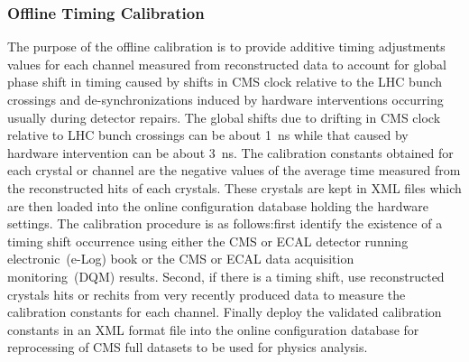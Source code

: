 \subsubsection{Offline Timing Calibration}
The purpose of the offline calibration is to provide additive timing adjustments values for each channel measured from reconstructed data to account for global phase shift in timing caused by shifts in CMS clock relative to the LHC bunch crossings and de-synchronizations induced by hardware interventions occurring usually during detector repairs. The global shifts due to drifting in CMS clock relative to LHC bunch crossings can be about 1~ns while that caused by hardware intervention can be about 3~ns. The calibration constants obtained for each crystal or channel are the negative values of the average time measured from the reconstructed hits of each crystals.
These crystals are  kept in XML files which are then loaded into the online configuration database holding the hardware settings. The calibration procedure is as follows:first identify the existence of a timing shift occurrence using either the CMS or ECAL detector running electronic~(e-Log) book or the CMS or ECAL data acquisition monitoring~(DQM) results. Second, if there is a timing shift, use reconstructed crystals hits or rechits from very recently produced data to measure the calibration constants for each channel. Finally deploy the validated calibration constants in an XML format file into the online configuration database for reprocessing of CMS full datasets to be used for physics analysis.

